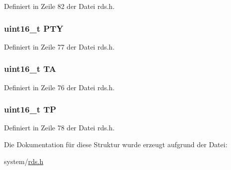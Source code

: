 Definiert in Zeile 82 der Datei rds.\+h.

\hypertarget{structgroup__0b_a0474967478fbbc2c71b800d2e0132d45}{}
\subsubsection[{P\+T\+Y}]{\setlength{\rightskip}{0pt plus 5cm}uint16\+\_\+t P\+T\+Y}\label{structgroup__0b_a0474967478fbbc2c71b800d2e0132d45}


Definiert in Zeile 77 der Datei rds.\+h.

\hypertarget{structgroup__0b_a6de7751205cef4ffcce610399a030892}{}
\subsubsection[{T\+A}]{\setlength{\rightskip}{0pt plus 5cm}uint16\+\_\+t T\+A}\label{structgroup__0b_a6de7751205cef4ffcce610399a030892}


Definiert in Zeile 76 der Datei rds.\+h.

\hypertarget{structgroup__0b_ab9e634c63b0d95a96716d5f6d7f06d72}{}
\subsubsection[{T\+P}]{\setlength{\rightskip}{0pt plus 5cm}uint16\+\_\+t T\+P}\label{structgroup__0b_ab9e634c63b0d95a96716d5f6d7f06d72}


Definiert in Zeile 78 der Datei rds.\+h.



Die Dokumentation für diese Struktur wurde erzeugt aufgrund der Datei\+:\begin{DoxyCompactItemize}
\item 
system/\hyperlink{rds_8h}{rds.\+h}\end{DoxyCompactItemize}
